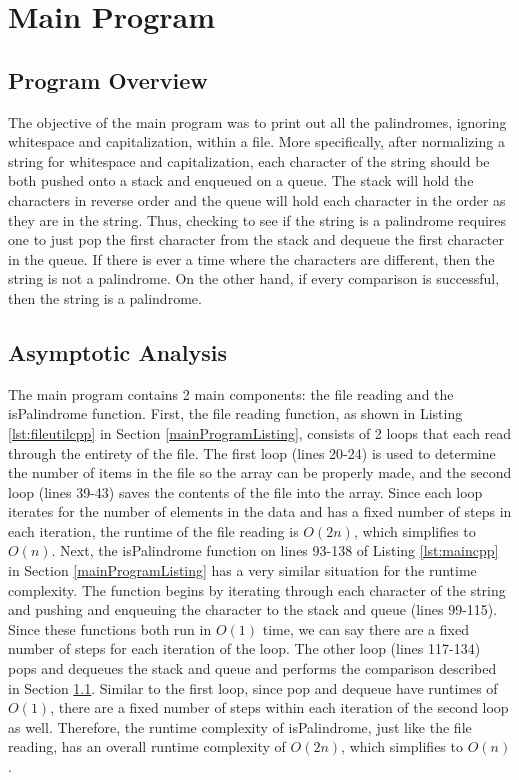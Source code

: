 \documentclass[letterpaper, 10pt,DIV=13]{scrartcl}
\numberwithin{equation}{section} %
\numberwithin{figure}{section} %
\numberwithin{table}{section} %
\begin{document}
\section{Main Program}
\subsection{Program Overview}\label{mainOverview}
The objective of the main program was to print out all the palindromes, ignoring whitespace and capitalization, within a file. More specifically, after normalizing a string for whitespace and capitalization, each character of the string should be both pushed onto a stack and enqueued on a queue. The stack will hold the characters in reverse order and the queue will hold each character in the order as they are in the string. Thus, checking to see if the string is a palindrome requires one to just pop the first character from the stack and dequeue the first character in the queue. If there is ever a time where the characters are different, then the string is not a palindrome. On the other hand, if every comparison is successful, then the string is a palindrome.

\subsection{Asymptotic Analysis}
The main program contains 2 main components: the file reading and the isPalindrome function. First, the file reading function, as shown in Listing \ref{lst:fileutilcpp} in Section \ref{mainProgramListing}, consists of 2 loops that each read through the entirety of the file. The first loop (lines 20-24) is used to determine the number of items in the file so the array can be properly made, and the second loop (lines 39-43) saves the contents of the file into the array. Since each loop iterates for the number of elements in the data and has a fixed number of steps in each iteration, the runtime of the file reading is $O(2n)$, which simplifies to $O(n)$. Next, the isPalindrome function on lines 93-138 of Listing \ref{lst:maincpp} in Section \ref{mainProgramListing} has a very similar situation for the runtime complexity. The function begins by iterating through each character of the string and pushing and enqueuing the character to the stack and queue (lines 99-115). Since these functions both run in $O(1)$ time, we can say there are a fixed number of steps for each iteration of the loop. The other loop (lines 117-134) pops and dequeues the stack and queue and performs the comparison described in Section \ref{mainOverview}. Similar to the first loop, since pop and dequeue have runtimes of $O(1)$, there are a fixed number of steps within each iteration of the second loop as well. Therefore, the runtime complexity of isPalindrome, just like the file reading, has an overall runtime complexity of $O(2n)$, which simplifies to $O(n)$.
\end{document}
